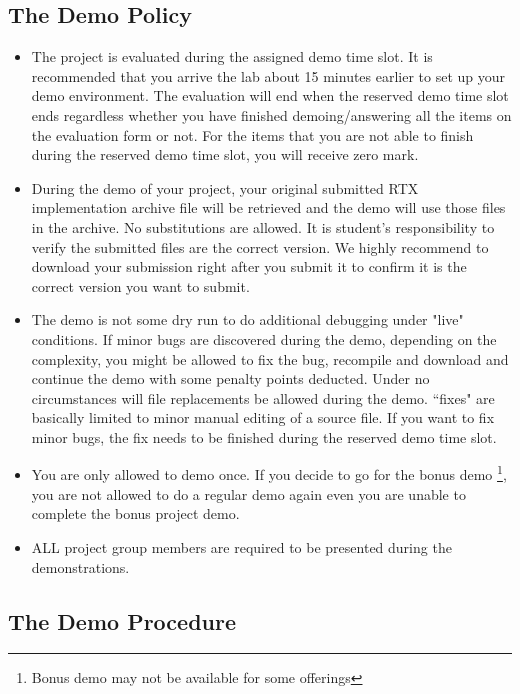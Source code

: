 \subsection{The Demo Policy}
    \begin{itemize}
        \item The project is evaluated during the assigned demo time slot. It is recommended that you arrive the lab about 15 minutes earlier to set up your demo environment. The evaluation will end when the reserved demo time slot ends regardless whether you have finished demoing/answering all the items on the evaluation form or not. For the items that you are not able to finish during the reserved demo time slot, you will receive zero mark. 
        \item During the demo of your project, your original submitted RTX implementation archive file will be retrieved and the demo will use those files in the archive. No substitutions are allowed. It is student's responsibility to verify the submitted files are the correct version. We highly recommend to download your submission right after you submit it to confirm it is the correct version you want to submit.
        \item The demo is not some dry run to do additional debugging under "live" conditions. If minor bugs are discovered during the demo, depending on the complexity, you might be allowed to fix the bug, recompile and download and continue the demo with some penalty points deducted. Under no circumstances will file replacements be allowed during the demo. ``fixes" are basically limited to minor manual editing of a source file.
If you want to fix minor bugs, the fix needs to be finished during the reserved demo time slot.
        \item You are only allowed to demo once. If you decide to go for the bonus demo
            \footnote{Bonus demo may not be available for some offerings},
            you are not allowed to do a regular demo again even you are unable to complete the bonus project demo. 
        \item ALL project group members are required to be presented during the demonstrations. 
    \end{itemize}
    
\subsection{The Demo Procedure}
